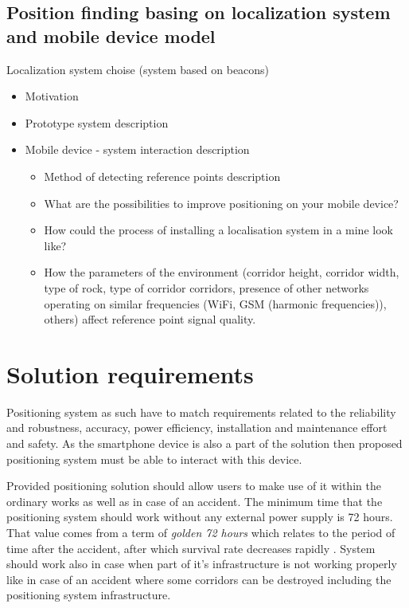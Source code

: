 \documentclass[../main.tex]{subfiles}
\begin{document}
\subsection{Position finding basing on localization system and mobile device model}

Localization system choise (system based on beacons)
\begin{itemize}
	\item  Motivation
	\item  Prototype system description
	\item  Mobile device - system interaction description
	\begin{itemize}
		\item  Method of detecting reference points description
		\item  What are the possibilities to improve positioning on your mobile device?
		\item  How could the process of installing a localisation system in a mine look like?
		\item  How the parameters of the environment (corridor height, corridor width, type of rock, type of corridor corridors, presence of other networks operating on similar frequencies (WiFi, GSM (harmonic frequencies)), others) affect reference point signal quality.
	\end{itemize}
\end{itemize}


\section{Solution requirements}
Positioning system as such have to match requirements related to the reliability and robustness, accuracy, power efficiency, installation and maintenance effort and safety. As the smartphone device is also a part of the solution then proposed positioning system must be able to interact with this device.

Provided positioning solution should allow users to make use of it within the ordinary works as well as in case of an accident. The minimum time that the positioning system should work without any external power supply is 72 hours. That value comes from a term of \textit{golden 72 hours} which relates to the period of time after the accident, after which survival rate decreases rapidly \cite{positioning_tests}. System should work also in case when part of it's infrastructure is not working properly like in case of an accident where some corridors can be destroyed including the positioning system infrastructure.
\end{document}
